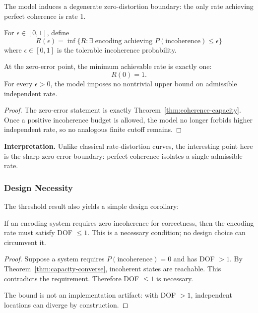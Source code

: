 The model induces a degenerate zero-distortion boundary: the only rate achieving perfect coherence is rate $1$.

\begin{definition}\label{def:rate-incoherence}
For $\epsilon\in[0,1]$, define
\[
R(\epsilon) = \inf\{R : \exists \text{ encoding achieving } P(\text{incoherence}) \leq \epsilon\}
\]
where $\epsilon \in [0, 1]$ is the tolerable incoherence probability.
\end{definition}

\begin{theorem}\label{thm:rate-incoherence-step}
At the zero-error point, the minimum achievable rate is exactly one:
\[
R(0)=1.
\]
For every $\epsilon>0$, the model imposes no nontrivial upper bound on admissible independent rate.
\end{theorem}

\begin{proof}
The zero-error statement is exactly Theorem~\ref{thm:coherence-capacity}. Once a positive incoherence budget is allowed, the model no longer forbids higher independent rate, so no analogous finite cutoff remains.
\end{proof}

\textbf{Interpretation.} Unlike classical rate-distortion curves, the interesting point here is the sharp zero-error boundary: perfect coherence isolates a single admissible rate.

\subsubsection{Design Necessity}

The threshold result also yields a simple design corollary:

\begin{theorem}\label{thm:design-necessity}
If an encoding system requires zero incoherence for correctness, then the encoding rate must satisfy DOF $\leq 1$. This is a necessary condition; no design choice can circumvent it.
\end{theorem}

\begin{proof}
Suppose a system requires $P(\text{incoherence}) = 0$ and has DOF $> 1$. By Theorem~\ref{thm:capacity-converse}, incoherent states are reachable. This contradicts the requirement. Therefore DOF $\leq 1$ is necessary.

The bound is not an implementation artifact: with DOF $> 1$, independent locations can diverge by construction.
\end{proof}


